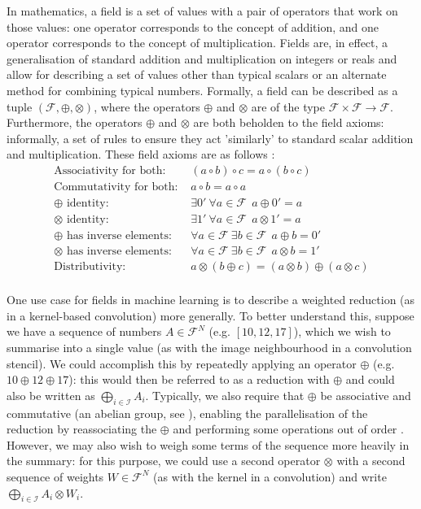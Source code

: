 \documentclass[11pt]{article} %
\begin{document}
In mathematics, a field is a set of values with a pair of operators that work on those values: one operator corresponds to the concept of addition, and one operator corresponds to the concept of multiplication. Fields are, in effect, a generalisation of standard addition and multiplication on integers or reals and allow for describing a set of values other than typical scalars or an alternate method for combining typical numbers. Formally, a field can be described as a tuple $(\mathcal{F}, \oplus, \otimes)$, where the operators $\oplus$ and $\otimes$ are of the type $\mathcal{F}\times\mathcal{F}\rightarrow\mathcal{F}$. Furthermore, the operators $\oplus$ and $\otimes$ are both beholden to the field axioms: informally, a set of rules to ensure they act 'similarly' to standard scalar addition and multiplication. These field axioms are as follows \cite{beachy2006abstract}:
\begin{align}
\textrm{Associativity for both: }& (a\circ b) \circ c = a \circ (b \circ c) \\ 
\textrm{Commutativity for both: }& a\circ b = a  \circ a \\
\oplus\textrm{ identity: }& \exists 0'~\forall a\in \mathcal{F}~~ a\oplus 0' = a \\ 
\otimes\textrm{ identity: }& \exists 1'~\forall a\in \mathcal{F}~~ a\otimes 1' = a \\ 
\oplus\textrm{ has inverse elements: }& \forall a\in \mathcal{F}~\exists b\in \mathcal{F}~~ a\oplus b = 0'  \\ 
\otimes\textrm{ has inverse elements: }& \forall a\in \mathcal{F}~\exists b\in \mathcal{F}~~ a\otimes b = 1'  \\ 
\textrm{Distributivity: }& a\otimes (b \oplus c) = (a\otimes b)\oplus(a\otimes c) \\
\end{align}

One use case for fields in machine learning is to describe a weighted reduction (as in a kernel-based convolution) more generally. To better understand this, suppose we have a sequence of numbers $A \in \mathcal{F}^N$  (e.g. $[10, 12, 17]$), which we wish to summarise into a single value (as with the image neighbourhood in a convolution stencil). We could accomplish this by repeatedly applying an operator $\oplus$ (e.g. $10 \oplus 12 \oplus 17$): this would then be referred to as a reduction with $\oplus$ and could also be written as $\bigoplus_{i\in \mathcal{I}}A_i$. Typically, we also require that $\oplus$ be associative and commutative (an abelian group, see ), enabling the parallelisation of the reduction by reassociating the $\oplus$ and performing some operations out of order \cite{ppad}. However, we may also wish to weigh some terms of the sequence more heavily in the summary: for this purpose, we could use a second operator $\otimes$ with a second sequence of weights $W \in \mathcal{F}^N$ (as with the kernel in a convolution) and write $\bigoplus_{i\in \mathcal{I}}A_i \otimes W_i$. 
\end{document}
